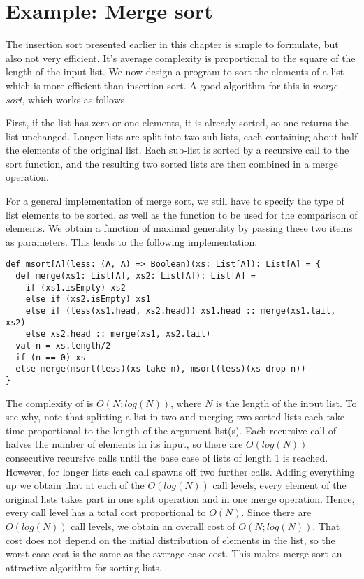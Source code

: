 \section{Example: Merge sort}

The insertion sort presented earlier in this chapter is simple to
formulate, but also not very efficient. It's average complexity is
proportional to the square of the length of the input list. We now
design a program to sort the elements of a list which is more
efficient than insertion sort. A good algorithm for this is {\em merge
sort}, which works as follows.

First, if the list has zero or one elements, it is already sorted, so
one returns the list unchanged. Longer lists are split into two
sub-lists, each containing about half the elements of the original
list. Each sub-list is sorted by a recursive call to the sort
function, and the resulting two sorted lists are then combined in a
merge operation.

For a general implementation of merge sort, we still have to specify
the type of list elements to be sorted, as well as the function to be
used for the comparison of elements. We obtain a function of maximal
generality by passing these two items as parameters. This leads to the
following implementation.
\begin{lstlisting}
def msort[A](less: (A, A) => Boolean)(xs: List[A]): List[A] = {
  def merge(xs1: List[A], xs2: List[A]): List[A] =
    if (xs1.isEmpty) xs2
    else if (xs2.isEmpty) xs1
    else if (less(xs1.head, xs2.head)) xs1.head :: merge(xs1.tail, xs2)
    else xs2.head :: merge(xs1, xs2.tail)
  val n = xs.length/2
  if (n == 0) xs
  else merge(msort(less)(xs take n), msort(less)(xs drop n))
}
\end{lstlisting}
The complexity of  is $O(N;log(N))$, where $N$ is the
length of the input list. To see why, note that splitting a list in
two and merging two sorted lists each take time proportional to the
length of the argument list(s). Each recursive call of 
halves the number of elements in its input, so there are $O(log(N))$
consecutive recursive calls until the base case of lists of length 1
is reached.  However, for longer lists each call spawns off two
further calls. Adding everything up we obtain that at each of the
$O(log(N))$ call levels, every element of the original lists takes
part in one split operation and in one merge operation. Hence, every
call level has a total cost proportional to $O(N)$. Since there are
$O(log(N))$ call levels, we obtain an overall cost of
$O(N;log(N))$. That cost does not depend on the initial distribution
of elements in the list, so the worst case cost is the same as the
average case cost. This makes merge sort an attractive algorithm for
sorting lists.

